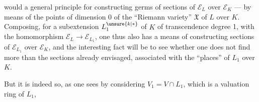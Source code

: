 would a general principle for constructing germs of sections of $\mathcal E_L$ over $\mathcal E_K$ --- by means of the points of dimension 0 of the ``Riemann variety'' $\mathfrak X$ of $L$ over $K$. Composing, for a subextension $L_1^{\unsure{k|*}}$ of $K$ of transcendence degree 1, with the homomorphism $\mathcal E_L\longrightarrow\mathcal E_{L_1}$, one thus also has a means of constructing  sections of $\mathcal E_{L_1}$ over $\mathcal E_K$, and the interesting fact will be to see whether one does not find more  than the sections already envisaged, associated with the ``places'' of $L_1$ over $K$.

But it is indeed so, as one sees by considering $V_1=V\cap L_1$, which is a valuation ring of $L_1$,

